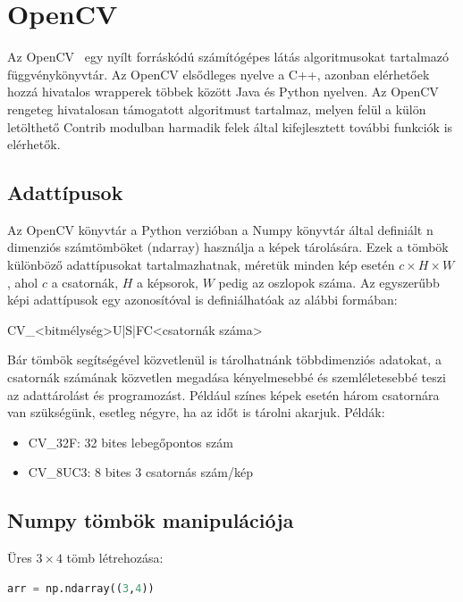 \documentclass[12pt,a4paper,oneside]{report}             %
\begin{document}
\section{OpenCV}

Az OpenCV~\cite{opencv} egy nyílt forráskódú számítógépes látás algoritmusokat tartalmazó függvénykönyvtár. Az OpenCV elsődleges nyelve a C++, azonban elérhetőek hozzá hivatalos wrapperek többek között Java és Python nyelven. Az OpenCV rengeteg hivatalosan támogatott algoritmust tartalmaz, melyen felül a külön letölthető Contrib modulban harmadik felek által kifejlesztett további funkciók is elérhetők.

\subsection{Adattípusok}

Az OpenCV könyvtár a Python verzióban a Numpy könyvtár által definiált n dimenziós számtömböket (ndarray) használja a képek tárolására. Ezek a tömbök különböző adattípusokat tartalmazhatnak, méretük minden kép esetén $c\times H\times W$, ahol $c$ a csatornák, $H$ a képsorok, $W$ pedig az oszlopok száma. Az egyszerűbb képi adattípusok egy azonosítóval is definiálhatóak az alábbi formában:

\begin{center} 
	CV\_<bitmélység>{U|S|F}C<csatornák száma>
\end{center} 

Bár tömbök segítségével közvetlenül is tárolhatnánk többdimenziós adatokat, a csatornák számának közvetlen megadása kényelmesebbé és szemléletesebbé teszi az adattárolást és programozást. Például színes képek esetén három csatornára van szükségünk, esetleg négyre, ha az időt is tárolni akarjuk.
Példák:
\begin{itemize}
	\item CV\_32F: 32 bites lebegőpontos szám
	\item CV\_8UC3: 8 bites 3 csatornás szám/kép
\end{itemize}

\subsection{Numpy tömbök manipulációja}

Üres $3\times 4$ tömb létrehozása:

\begin{lstlisting}[language=Python]
arr = np.ndarray((3,4))
\end{lstlisting}
\end{document}
